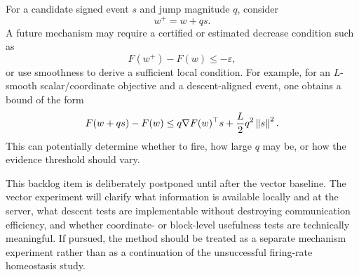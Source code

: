 For a candidate signed event $s$ and jump magnitude $q$, consider
\begin{equation}
  w^+=w+q s.
\end{equation}
A future mechanism may require a certified or estimated decrease condition such as
\begin{equation}
  F(w^+)-F(w)\leq -\varepsilon,
\end{equation}
or use smoothness to derive a sufficient local condition. For example, for an $L$-smooth scalar/coordinate objective and a descent-aligned event, one obtains a bound of the form
\begin{equation}
  F(w+q s)-F(w)
  \leq q\nabla F(w)^\top s+\frac{L}{2}q^2\left\lVert s\right\rVert^2.
\end{equation}
This can potentially determine whether to fire, how large $q$ may be, or how the evidence threshold should vary.

This backlog item is deliberately postponed until after the vector baseline. The vector experiment will clarify what information is available locally and at the server, what descent tests are implementable without destroying communication efficiency, and whether coordinate- or block-level usefulness tests are technically meaningful. If pursued, the method should be treated as a separate mechanism experiment rather than as a continuation of the unsuccessful firing-rate homeostasis study.
